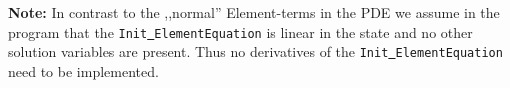 {\bf Note:} In contrast to the ,,normal'' Element-terms in the PDE we assume in the program 
that the \texttt{Init\underline{ }ElementEquation} is linear in the state and no other solution variables are present.
Thus no derivatives of the \texttt{Init\underline{ }ElementEquation} need to be implemented.
